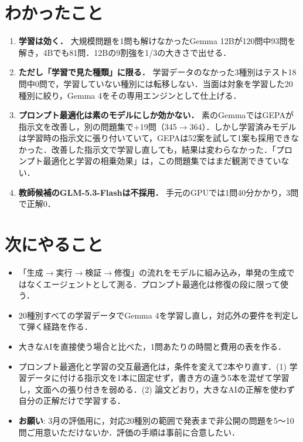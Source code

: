 \documentclass[10pt,a4paper]{article}
\begin{document}
\section{わかったこと}
\begin{enumerate}
  \item \textbf{学習は効く．} 大規模問題を1問も解けなかったGemma 12Bが120問中93問を解き，4Bでも81問．12Bの9割強を1/3の大きさで出せる．
  \item \textbf{ただし「学習で見た種類」に限る．} 学習データのなかった3種別はテスト18問中0問で，学習していない種別には転移しない．当面は対象を学習した20種別に絞り，Gemma 4をその専用エンジンとして仕上げる．
  \item \textbf{プロンプト最適化は素のモデルにしか効かない．} 素のGemmaではGEPAが指示文を改善し，別の問題集で+19問（345$\rightarrow$364）．しかし学習済みモデルは学習時の指示文に張り付いていて，GEPAは52案を試して1案も採用できなかった．改善した指示文で学習し直しても，結果は変わらなかった．「プロンプト最適化と学習の相乗効果」は，この問題集ではまだ観測できていない．
  \item \textbf{教師候補のGLM-5.3-Flashは不採用．} 手元のGPUでは1問40分かかり，3問で正解0．
\end{enumerate}

\section{次にやること}
\begin{itemize}
  \item 「生成$\rightarrow$実行$\rightarrow$検証$\rightarrow$修復」の流れをモデルに組み込み，単発の生成ではなくエージェントとして測る．プロンプト最適化は修復の段に限って使う．
  \item 20種別すべての学習データでGemma 4を学習し直し，対応外の要件を判定して弾く経路を作る．
  \item 大きなAIを直接使う場合と比べた，1問あたりの時間と費用の表を作る．
  \item プロンプト最適化と学習の交互最適化は，条件を変えて2本やり直す．(1) 学習データに付ける指示文を1本に固定せず，書き方の違う5本を混ぜて学習し，文面への張り付きを弱める．(2) 論文どおり，大きなAIの正解を使わず自分の正解だけで学習する．
  \item \textbf{お願い}: 3月の評価用に，対応20種別の範囲で発表まで非公開の問題を5〜10問ご用意いただけないか．評価の手順は事前に合意したい．
\end{itemize}
\end{document}

